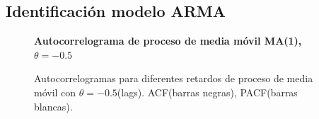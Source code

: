 \subsection{Identificaci\'on modelo ARMA}


\begin{figure}[H]
	\centering
	\textbf{Autocorrelograma de proceso de media móvil MA(1), $\theta=-0.5$ }\par\medskip
	\caption{Autocorrelogramas para diferentes retardos de proceso de media móvil con $\theta=-0.5$(lags). ACF(barras negras), PACF(barras blancas).}\label{fig13}
\end{figure}



